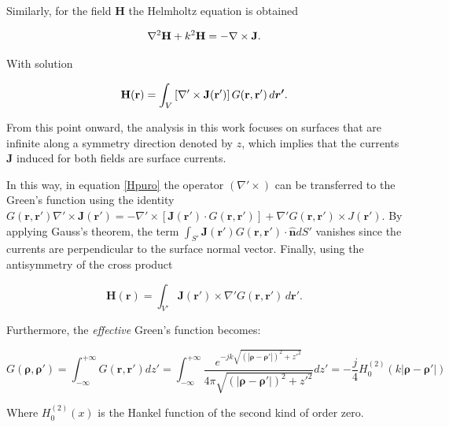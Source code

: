 \documentclass[11pt,a4paper,twoside,pdf]{article}
\numberwithin{equation}{section}
\begin{document}
Similarly, for the field $\mathbf{H}$ the Helmholtz equation is obtained

\begin{equation}
\label{eq:helmholtz_H}
\nabla^2 \mathbf{H} + k^2 \mathbf{H}
=
- \nabla \times \mathbf{J}.
\notag
\end{equation}

With solution

\begin{equation}
\mathbf{H}(\mathbf{r})
=
\int_{V}
\left[
\nabla' \times \mathbf{J}(\mathbf{r}')
\right]
G(\mathbf{r},\mathbf{r}')
\, d\bm{r'}.
\label{Hpuro}
\notag
\end{equation}



From this point onward, the analysis in this work focuses on surfaces that are infinite along a symmetry direction denoted by $z$, which implies that the currents $\mathbf{J}$ induced for both fields are surface currents.

In this way, in equation \ref{Hpuro} the operator $(\nabla' \times)$ can be transferred to the Green's function using the identity $ G(\mathbf{r}, \mathbf{r'}) \nabla' \times \mathbf{J(\mathbf{r'})} = -\nabla' \times \left[ \mathbf{J}(\mathbf{r'}) \cdot G(\mathbf{r}, \mathbf{r'}) \right]  + \nabla'G(\mathbf{r}, \mathbf{r'}) \times J(\mathbf{r'})$. By applying Gauss's theorem, the term $\int_{S'}  \mathbf{J}(\mathbf{r'}) G(\mathbf{r}, \mathbf{r'}) \cdot \bm{\hat{n}} dS' $ vanishes since the currents are perpendicular to the surface normal vector. Finally, using the antisymmetry of the cross product


\begin{equation}
\mathbf{H}(\mathbf{r})
=
\int_{V'}
 \mathbf{J}(\mathbf{r}') \times \nabla'
G(\mathbf{r},\mathbf{r}')
\, d\bm{r'}.
\label{Hpuro2}
\end{equation}



Furthermore, the \textit{effective} Green's function becomes:

\[
G(\bm{\rho}, \bm{\rho'}) = \int_{-\infty}^{+\infty} G(\mathbf{r}, \mathbf{r'}) dz' = \int_{-\infty}^{+\infty} \frac{e^{-jk\sqrt{(|\bm{\rho} - \bm{\rho'}|)^2 + z'^2 }}}{ 4\pi \sqrt{(|\bm{\rho} - \bm{\rho'}|)^2 + z'^2 } } dz' = -\frac{j}{4} H^{(2)}_0(k|\bm{\rho} - \bm{\rho'}| )
\]

Where $H^{(2)}_0(x)$ is the Hankel function of the second kind of order zero.\\
\end{document}
